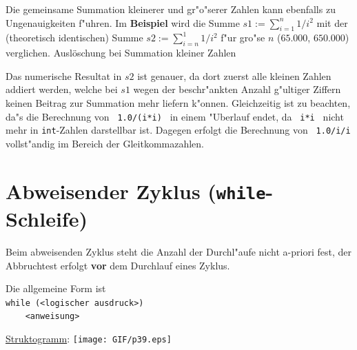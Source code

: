 Die gemeinsame Summation kleinerer und gr"o"serer Zahlen kann ebenfalls zu
Ungenauigkeiten f"uhren. Im \textbf{Beispiel} wird
die Summe $s1:=\sum\limits_{i=1}^{n} 1/i^2$ mit
der (theoretisch identischen) Summe $s2:=\sum\limits_{i=n}^{1} 1/i^2$
f"ur gro"se $n$ ($65.000$, $650.000$) verglichen.
%
{Auslöschung bei Summation kleiner Zahlen}
%

Das numerische Resultat in $s2$ ist genauer, da dort zuerst alle kleinen
Zahlen addiert werden, welche bei $s1$
wegen der beschr"ankten Anzahl g"ultiger Ziffern
keinen Beitrag zur Summation mehr liefern k"onnen.
Gleichzeitig ist zu beachten, da"s die Berechnung
von \verb| 1.0/(i*i) | in einem "Uberlauf endet, da \verb| i*i |
nicht mehr in \verb|int|-Zahlen darstellbar ist.
Dagegen erfolgt die Berechnung von \verb| 1.0/i/i |
vollst"andig im Bereich der Gleitkommazahlen.
%
%
%
\pagebreak
\section[Abweisender Zyklus]{Abweisender Zyklus (\texttt{while}-Schleife)}
\label{p:4.5}
%
Beim abweisenden Zyklus steht die Anzahl der Durchl"aufe nicht
a-priori fest, der Abbruchtest erfolgt \textbf{vor} dem Durchlauf eines Zyklus.

% 

\begin{minipage}[t]{0.5\textwidth}
Die allgemeine Form ist\\[1ex]
\phantom{XXX}\verb|while (<logischer ausdruck>)| \\
\phantom{XXX}\verb|    <anweisung>|
\end{minipage}
\begin{minipage}[t]{0.4\textwidth}
\underline{Struktogramm}: %
\texttt{[image: GIF/p39.eps]}
\end{minipage}

